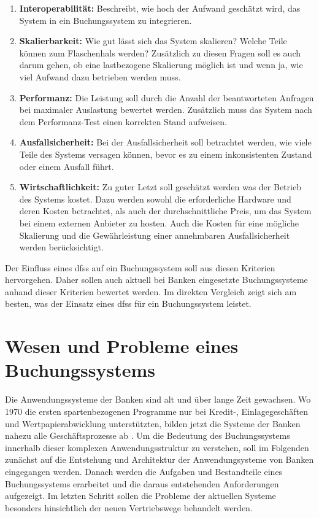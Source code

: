 \documentclass[12pt,oneside,a4paper,parskip]{scrbook}
\begin{document}
\begin{enumerate}
  \item \textbf{Interoperabilität:} Beschreibt, wie hoch der Aufwand geschätzt wird, das System in ein Buchungssystem zu integrieren.
  \item \textbf{Skalierbarkeit:} Wie gut lässt sich das System skalieren? Welche Teile können zum Flaschenhals werden? Zusätzlich zu diesen Fragen soll es auch darum gehen, ob eine lastbezogene Skalierung möglich ist und wenn ja, wie viel Aufwand dazu betrieben werden muss.
  \item \textbf{Performanz:} Die Leistung soll durch die Anzahl der beantworteten Anfragen bei maximaler Auslastung bewertet werden. Zusätzlich muss das System nach dem Performanz-Test einen korrekten Stand aufweisen.
  \item \textbf{Ausfallsicherheit:} Bei der Ausfallsicherheit soll betrachtet werden, wie viele Teile des Systems versagen können, bevor es zu einem inkonsistenten Zustand oder einem Ausfall führt.
  \item \textbf{Wirtschaftlichkeit:} Zu guter Letzt soll geschätzt werden was der Betrieb des Systems kostet. Dazu werden sowohl die erforderliche Hardware und deren Kosten betrachtet, als auch der durchschnittliche Preis, um das System bei einem externen Anbieter zu hosten. Auch die Kosten für eine mögliche Skalierung und die Gewährleistung einer annehmbaren Ausfallsicherheit werden berücksichtigt.
\end{enumerate}

Der Einfluss eines \acp{dfs} auf ein Buchungssystem soll aus diesen Kriterien hervorgehen.
Daher sollen auch aktuell bei Banken eingesetzte Buchungssysteme anhand dieser Kriterien bewertet werden. Im direkten Vergleich zeigt sich am besten, was der Einsatz eines \acp{dfs} für ein Buchungssystem leistet.

\chapter{Wesen und Probleme eines Buchungssystems}
\label{bookingSystem}
Die Anwendungssysteme der Banken sind alt und über lange Zeit gewachsen. Wo 1970 die ersten spartenbezogenen Programme nur bei Kredit-, Einlagegeschäften und
Wertpapierabwicklung unterstützten, bilden jetzt die Systeme der Banken nahezu alle Geschäftsprozesse ab \cite[16]{ITidF}. Um die Bedeutung des Buchungssystems innerhalb dieser komplexen Anwendungsstruktur zu verstehen, soll im Folgenden zunächst auf die Entstehung und Architektur der Anwendungsysteme von Banken eingegangen werden. Danach werden die Aufgaben und Bestandteile eines Buchungssystems erarbeitet und die daraus entstehenden Anforderungen aufgezeigt. Im letzten Schritt sollen die Probleme der aktuellen Systeme besonders hinsichtlich der neuen Vertriebswege behandelt werden. 
\label{buchungssystem}
\end{document}
